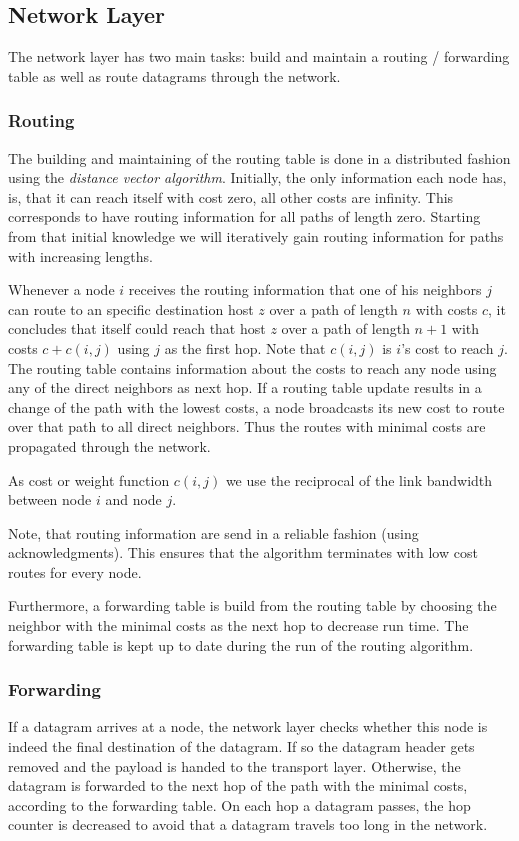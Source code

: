\newpage

\subsection{Network Layer}

  The network layer has two main tasks: build and maintain a routing / forwarding table as well as route datagrams through the network. 

  \subsubsection{Routing}
  The building and maintaining of the routing table is done in a distributed fashion using the \emph{distance vector algorithm}. Initially, the only information each node has, is, that it can reach itself with cost zero, all other costs are infinity. This corresponds to have routing information for all paths of length zero. Starting from that initial knowledge we will iteratively gain routing information for paths with increasing lengths.

  Whenever a node $i$ receives the routing information that one of his neighbors $j$ can route to an specific destination host $z$ over a path of length $n$ with costs $c$, it concludes that itself could reach that host $z$ over a path of length $n+1$ with costs $c+c(i,j)$ using $j$ as the first hop. Note that $c(i,j)$ is $i$'s cost to reach $j$. The routing table contains information about the costs to reach any node using any of the direct neighbors as next hop. If a routing table update results in a change of the path with the lowest costs, a node broadcasts its new cost to route over that path to all direct neighbors. Thus the routes with minimal costs are propagated through the network.

  As cost or weight function $c(i,j)$ we use the reciprocal of the link bandwidth between node $i$ and node $j$. 

  Note, that routing information are send in a reliable fashion (using acknowledgments). This ensures that the algorithm terminates with low cost routes for every node.

  Furthermore, a forwarding table is build from the routing table by choosing the neighbor with the minimal costs as the next hop to decrease run time. The forwarding table is kept up to date during the run of the routing algorithm.

  \subsubsection{Forwarding}
  If a datagram arrives at a node, the network layer checks whether this node is indeed the final destination of the datagram. If so the datagram header gets removed and the payload is handed to the transport layer. Otherwise, the datagram is forwarded to the next hop of the path with the minimal costs, according to the forwarding table. On each hop a datagram passes, the hop counter is decreased to avoid that a datagram travels too long in the network.


